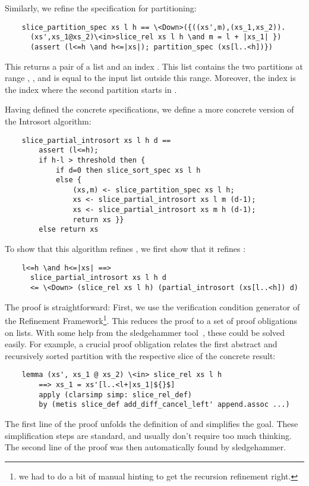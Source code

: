 \documentclass[sigplan,10pt,anonymous,review]{acmart}\settopmatter{printfolios=true,printccs=false,printacmref=false}
\theoremstyle{definition}
\begin{document}
  Similarly, we refine the specification for partitioning:
  \begin{lstlisting}
    slice_partition_spec xs l h == \<Down>({((xs',m),(xs_1,xs_2)).
      (xs',xs_1@xs_2)\<in>slice_rel xs l h \and m = l + |xs_1| })
      (assert (l<=h \and h<=|xs|); partition_spec (xs[l..<h])})
  \end{lstlisting}
  This returns a pair of a list  and an index .
  This list  contains the two partitions  at range , ,
  and is equal to the input list  outside this range. Moreover, the index 
  is the index where the second partition starts in .

  Having defined the concrete specifications, we define a more concrete version of the Introsort algorithm:
  \begin{lstlisting}
    slice_partial_introsort xs l h d ==
        assert (l<=h);
        if h-l > threshold then {
            if d=0 then slice_sort_spec xs l h
            else {
                (xs,m) <- slice_partition_spec xs l h;
                xs <- slice_partial_introsort xs l m (d-1);
                xs <- slice_partial_introsort xs m h (d-1);
                return xs }}
        else return xs
  \end{lstlisting}
  To show that this algorithm refines , we first show that it refines :
  \begin{theorem}\label{thm:slice_partial_introsort_refines}
  \begin{lstlisting}
    l<=h \and h<=|xs| ==>
      slice_partial_introsort xs l h d
      <= \<Down> (slice_rel xs l h) (partial_introsort (xs[l..<h]) d)
  \end{lstlisting}
  \end{theorem}
  The proof is straightforward: First, we use the verification condition generator of the
  Refinement Framework\footnote{we had to do a bit of manual hinting to get the recursion refinement right.}.
  This reduces the proof to a set of proof obligations on lists. With some help from the sledgehammer
  tool~\cite{BBP13}, these could be solved easily. For example, a crucial proof obligation relates the first abstract and recursively
  sorted partition with the respective slice of the concrete result:
  \begin{lstlisting}
    lemma (xs', xs_1 @ xs_2) \<in> slice_rel xs l h
        ==> xs_1 = xs'[l..<l+|xs_1|${}$]
        apply (clarsimp simp: slice_rel_def)
        by (metis slice_def add_diff_cancel_left' append.assoc ...)
  \end{lstlisting}
  The first line of the proof unfolds the definition of  and simplifies the goal.
  These simplification steps are standard, and usually don't require too much thinking.
  The second line of the proof was then automatically found by sledgehammer.
\end{document}
